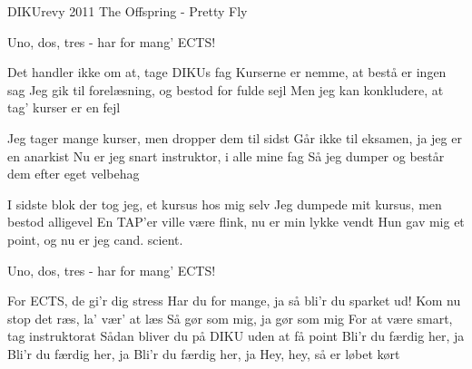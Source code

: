 {DIKUrevy 2011}
{The Offspring - Pretty Fly}
{

Uno, dos, tres - har for mang' ECTS!

Det handler ikke om at, tage DIKUs fag
Kurserne er nemme, at bestå er ingen sag
Jeg gik til forelæsning, og bestod for fulde sejl
Men jeg kan konkludere, at tag' kurser er en fejl


Jeg tager mange kurser, men dropper dem til sidst
Går ikke til eksamen, ja jeg er en anarkist
Nu er jeg snart instruktor, i alle mine fag
Så jeg dumper og består dem efter eget velbehag


I sidste blok der tog jeg, et kursus hos mig selv
Jeg dumpede mit kursus, men bestod alligevel
En TAP'er ville være flink, nu er min lykke vendt
Hun gav mig et point, og nu er jeg cand. scient.


Uno, dos, tres - har for mang' ECTS!

For ECTS, de gi'r dig stress
Har du for mange, ja så bli'r du sparket ud!
Kom nu stop det ræs, la' vær' at læs
Så gør som mig, ja gør som mig
For at være smart, tag instruktorat
Sådan bliver du på DIKU uden at få point
Bli'r du færdig her, ja
Bli'r du færdig her, ja
Bli'r du færdig her, ja
Hey, hey, så er løbet kørt
}